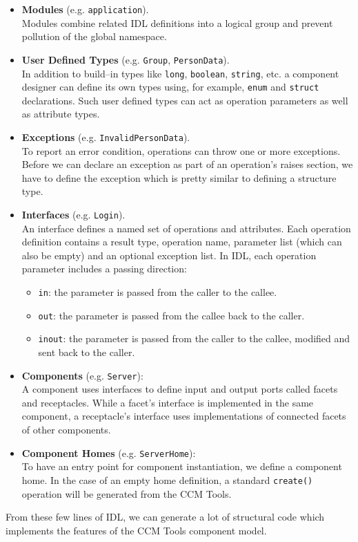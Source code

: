 \begin{itemize}
\item {\bf Modules} (e.g. {\tt application}).\\
Modules combine related IDL definitions into a logical group and prevent
pollution of the global namespace.   
   
\item {\bf User Defined Types} (e.g. {\tt Group}, {\tt PersonData}). \\
In addition to build--in types like {\tt long}, {\tt boolean}, {\tt string}, etc. a 
component designer can define its own types using, for example, {\tt enum} and {\tt struct} declarations.
Such user defined types can act as operation parameters as well as attribute types. 

\item {\bf Exceptions} (e.g. {\tt InvalidPersonData}). \\
To report an error condition, operations can throw one or more exceptions. 
Before we can declare an exception as part of an operation's raises section, we have to
define the exception which is pretty similar to defining a structure type.

\item {\bf Interfaces} (e.g. {\tt Login}). \\
An interface defines a named set of operations and attributes.
Each operation definition contains a result type, operation name, 
parameter list (which can also be empty) and an optional exception list.
In IDL, each operation parameter includes a passing direction:
	\begin{itemize}
	\item {\tt in}: the parameter is passed from the caller to the 
					callee.
	\item {\tt out}: the parameter is passed from the callee back 
					to the caller.
	\item {\tt inout}: the parameter is passed from the caller to 
					the callee, modified and sent back to the caller.
	\end{itemize}

\item {\bf Components} (e.g. {\tt Server}): \\
A component uses interfaces to define input and output ports called facets 
and receptacles. 
While a facet's interface is implemented in the same component, a 
receptacle's interface uses implementations of connected facets of other 
components.

\item {\bf Component Homes} (e.g. {\tt ServerHome}): \\
To have an entry point for component instantiation, we define a component 
home. In the case of an empty home definition, a standard {\tt create()} 
operation will be generated from the CCM Tools.
\end{itemize}

From these few lines of IDL, we can generate a lot of structural code which 
implements the features of the CCM Tools component model.

\newpage

